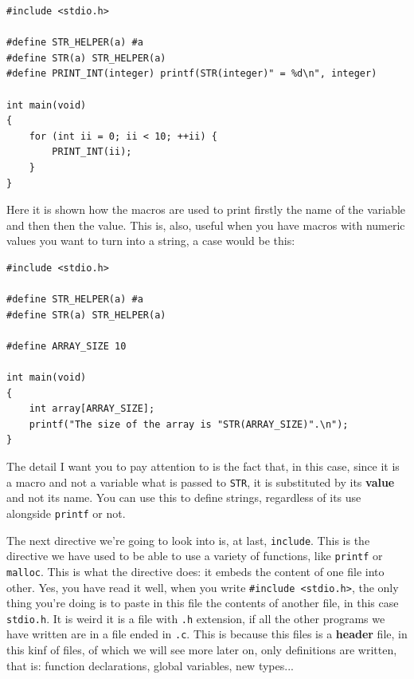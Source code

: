 \documentclass[a4paper]{article}
\begin{document}
\noindent
\begin{minipage}[H]{\linewidth}
\mbox{}
\begin{lstlisting}[style=C,
caption={Macro to stringify},
label={lst:stringifyMacro}]
#include <stdio.h>

#define STR_HELPER(a) #a
#define STR(a) STR_HELPER(a)
#define PRINT_INT(integer) printf(STR(integer)" = %d\n", integer)

int main(void)
{
    for (int ii = 0; ii < 10; ++ii) {
        PRINT_INT(ii);
    }
}
\end{lstlisting}
\end{minipage}

Here it is shown how the macros are used to print firstly the name of the
variable and then then the value. This is, also, useful when you have macros
with numeric values you want to turn into a string, a case would be this:

\noindent
\begin{minipage}[H]{\linewidth}
\mbox{}
\begin{lstlisting}[style=C,
caption={Converting numeric macros to string},
label={lst:stringifyMacroAndMacro}]
#include <stdio.h>

#define STR_HELPER(a) #a
#define STR(a) STR_HELPER(a)

#define ARRAY_SIZE 10

int main(void)
{
    int array[ARRAY_SIZE];
    printf("The size of the array is "STR(ARRAY_SIZE)".\n");
}
\end{lstlisting}
\end{minipage}

The detail I want you to pay attention to is the fact that, in this case, since
it is a macro and not a variable what is passed to \verb!STR!, it is substituted
by its \textbf{value} and not its name. You can use this to define strings,
regardless of its use alongside \verb!printf! or not.

The next directive we're going to look into is, at last, \verb!include!. This is
the directive we have used to be able to use a variety of functions, like
\verb!printf! or \verb!malloc!. This is what the directive does: it embeds the
content of one file into other. Yes, you have read it well, when you write
\verb!#include <stdio.h>!, the only thing you're doing is to paste in this file
the contents of another file, in this case \verb!stdio.h!. It is weird it is a
file with \verb!.h! extension, if all the other programs we have written are
in a file ended in \verb!.c!. This is because this files is a \textbf{header}
file, in this kinf of files, of which we will see more later on, only
definitions are written, that is: function declarations, global variables, new
types...
\end{document}

